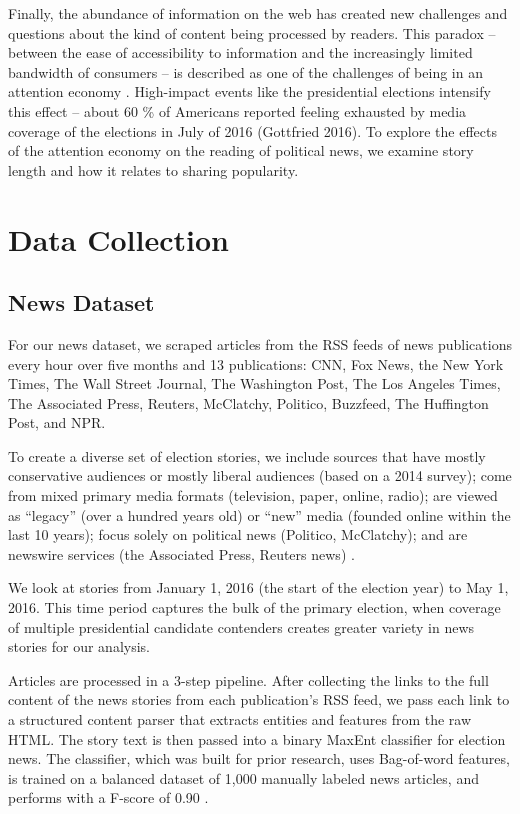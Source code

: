 \documentclass[letterpaper]{article}
\begin{document}
Finally, the abundance of information on the web has created new challenges and questions about the kind of content being processed by readers. This paradox -- between the ease of accessibility to information and the increasingly limited bandwidth of consumers -- is described as one of the challenges of being in an attention economy \cite{goldhaber1997attention}. High-impact events like the presidential elections intensify this effect -- about 60 \% of Americans reported feeling exhausted by media coverage of the elections in July of 2016 (Gottfried 2016). To explore the effects of the attention economy on the reading of political news, we examine story length and how it relates to sharing popularity.
 
\section{Data Collection} 

\subsection{News Dataset}
For our news dataset, we scraped articles from the RSS feeds of news publications every hour over five months and 13 publications: CNN, Fox News, the New York Times, The Wall Street Journal, The Washington Post, The Los Angeles Times, The Associated Press, Reuters, McClatchy, Politico, Buzzfeed, The Huffington Post, and NPR.

To create a diverse set of election stories, we include sources that have mostly conservative audiences or mostly liberal audiences (based on a 2014 survey); come from mixed primary media formats (television, paper, online, radio); are viewed as ``legacy'' (over a hundred years old) or ``new'' media (founded online within the last 10 years); focus solely on political news (Politico, McClatchy); and are newswire services (the Associated Press, Reuters news) \cite{PoliticalPolarization}. 
  
We look at stories from January 1, 2016 (the start of the election year) to May 1, 2016. This time period captures the bulk of the primary election, when coverage of multiple presidential candidate contenders creates greater variety in news stories for our analysis.

Articles are processed in a 3-step pipeline. After collecting the links to the full content of the news stories from each publication's RSS feed, we pass each link to a structured content parser that extracts entities and features from the raw HTML. The story text is then passed into a binary MaxEnt classifier for election news. The classifier, which was built for prior research, uses Bag-of-word features, is trained on a balanced dataset of 1,000 manually labeled news articles, and performs with a F-score of 0.90 \cite{vijayaraghavan-thesis}. 
\end{document}
